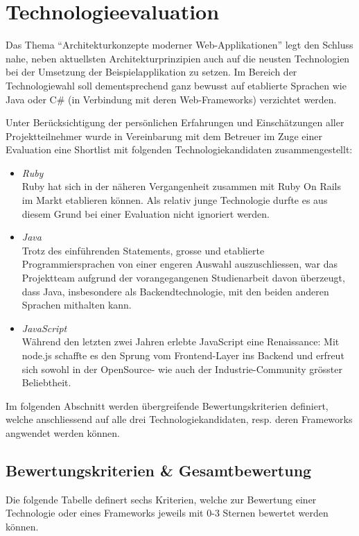 \section{Technologieevaluation}
Das Thema ``Architekturkonzepte moderner Web-Applikationen'' legt den Schluss nahe, neben aktuellsten Architekturprinzipien auch auf die neusten Technologien bei der Umsetzung der Beispielapplikation zu setzen. Im Bereich der Technologiewahl soll dementsprechend ganz bewusst auf etablierte Sprachen wie Java oder C\# (in Verbindung mit deren Web-Frameworks) verzichtet werden.

Unter Berücksichtigung der persönlichen Erfahrungen und Einschätzungen aller Projektteilnehmer wurde in Vereinbarung mit dem Betreuer im Zuge einer Evaluation eine Shortlist mit folgenden Technologiekandidaten zusammengestellt:

\begin{itemize}
	\item \emph{Ruby}\\
	Ruby hat sich in der näheren Vergangenheit zusammen mit Ruby On Rails im Markt etablieren können. Als relativ junge Technologie durfte es aus diesem Grund bei einer Evaluation nicht ignoriert werden.

	\item \emph{Java}\\
	Trotz des einführenden Statements, grosse und etablierte Programmiersprachen von einer engeren Auswahl auszuschliessen, war das Projektteam aufgrund der vorangegangenen Studienarbeit davon überzeugt, dass Java, insbesondere als Backendtechnologie, mit den beiden anderen Sprachen mithalten kann.

	\item \emph{JavaScript}\\
	Während den letzten zwei Jahren erlebte JavaScript eine Renaissance: Mit node.js schaffte es den Sprung vom Frontend-Layer ins Backend und erfreut sich sowohl in der OpenSource- wie auch der Industrie-Community grösster Beliebtheit.
\end{itemize}

Im folgenden Abschnitt werden übergreifende Bewertungskriterien definiert, welche anschliessend auf alle drei Technologiekandidaten, resp. deren Frameworks angwendet werden können.

\newpage
\subsection{Bewertungskriterien \protect\& Gesamtbewertung}
Die folgende Tabelle definert sechs Kriterien, welche zur Bewertung einer Technologie oder eines Frameworks jeweils mit 0-3 Sternen bewertet werden können.

